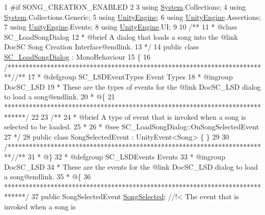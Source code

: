 \begin{DoxyCodeInclude}
1 \textcolor{preprocessor}{#if SONG\_CREATION\_ENABLED}
2 
3 \textcolor{keyword}{using} \hyperlink{namespace_system}{System}.Collections;
4 \textcolor{keyword}{using} \hyperlink{namespace_system}{System}.Collections.Generic;
5 \textcolor{keyword}{using} \hyperlink{namespace_unity_engine}{UnityEngine};
6 \textcolor{keyword}{using} \hyperlink{namespace_unity_engine}{UnityEngine}.Assertions;
7 \textcolor{keyword}{using} \hyperlink{namespace_unity_engine}{UnityEngine}.Events;
8 \textcolor{keyword}{using} \hyperlink{namespace_unity_engine}{UnityEngine}.UI;
9 \textcolor{comment}{}
10 \textcolor{comment}{/**}
11 \textcolor{comment}{ * @class SC\_LoadSongDialog}
12 \textcolor{comment}{ * @brief A dialog that loads a song into the @link DocSC Song Creation Interface@endlink.}
13 \textcolor{comment}{*/}
14 \textcolor{keyword}{public} \textcolor{keyword}{class }\hyperlink{class_s_c___load_song_dialog}{SC\_LoadSongDialog} : MonoBehaviour
15 \{
16     \textcolor{comment}{/*************************************************************************/}\textcolor{comment}{/** }
17 \textcolor{comment}{    * @defgroup SC\_LSDEventTypes Event Types}
18 \textcolor{comment}{    * @ingroup DocSC\_LSD}
19 \textcolor{comment}{    * These are the types of events for the @link DocSC\_LSD dialog to load a song@endlink.}
20 \textcolor{comment}{    * @\{}
21 \textcolor{comment}{    ******************************************************************************/}
22 \textcolor{comment}{}
23 \textcolor{comment}{    /**}
24 \textcolor{comment}{     * @brief A type of event that is invoked when a song is selected to be loaded.}
25 \textcolor{comment}{     * }
26 \textcolor{comment}{     * @see SC\_LoadSongDialog::OnSongSelectedEvent}
27 \textcolor{comment}{    */}
28     \textcolor{keyword}{public} \textcolor{keyword}{class }SongSelectedEvent : UnityEvent<Song> \{ \}
29 
30     \textcolor{comment}{/*************************************************************************/}\textcolor{comment}{/** }
31 \textcolor{comment}{    * @\}}
32 \textcolor{comment}{    * @defgroup SC\_LSDEvents Events}
33 \textcolor{comment}{    * @ingroup DocSC\_LSD}
34 \textcolor{comment}{    * These are the events for the @link DocSC\_LSD dialog to load a song@endlink.}
35 \textcolor{comment}{    * @\{}
36 \textcolor{comment}{    ******************************************************************************/}
37     \textcolor{keyword}{public} SongSelectedEvent \hyperlink{group___s_c___l_s_d_events_ga48d606b2c8291fee822dcc2b14ddcecc}{SongSelected}; \textcolor{comment}{//!< The event that is invoked when a song is
}
\end{DoxyCodeInclude}
